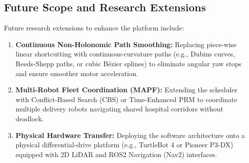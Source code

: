\documentclass[12pt,a4paper]{article}
\begin{document}
\subsection{Future Scope and Research Extensions}
Future research extensions to enhance the platform include:
\begin{enumerate}[itemsep=2pt,topsep=2pt]
\item \textbf{Continuous Non-Holonomic Path Smoothing:} Replacing piece-wise linear shortcutting with continuous-curvature paths (e.g., Dubins curves, Reeds-Shepp paths, or cubic B\'ezier splines) to eliminate angular yaw stops and ensure smoother motor acceleration.
\item \textbf{Multi-Robot Fleet Coordination (MAPF):} Extending the scheduler with Conflict-Based Search (CBS) or Time-Enhanced PRM to coordinate multiple delivery robots navigating shared hospital corridors without deadlock.
\item \textbf{Physical Hardware Transfer:} Deploying the software architecture onto a physical differential-drive platform (e.g., TurtleBot 4 or Pioneer P3-DX) equipped with 2D LiDAR and ROS2 Navigation (Nav2) interfaces.
\end{enumerate}

\newpage
\end{document}
